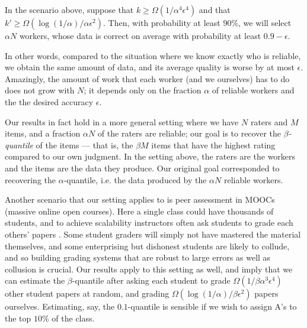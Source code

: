 \begin{theorem}
\label{thm:intro}
In the scenario above, suppose that $k \geq \Omega(1/\alpha^4\epsilon^4)$
and that $k' \geq \Omega(\log(1/\alpha)/\alpha\epsilon^2)$. Then, with probability 
at least $90\%$, we will select $\alpha N$ workers, whose data is correct on 
average with probability at least $0.9-\epsilon$.
\end{theorem}
In other words, compared to the situation where we know exactly who is reliable, 
we obtain the same amount of data, and its average quality is worse by at most 
$\epsilon$. Amazingly, the amount of work that each worker (and we ourselves) has 
to do does not grow with $N$; it depends only on the fraction $\alpha$ of 
reliable workers and the the desired accuracy $\epsilon$.

Our results in fact hold in a more general setting where we have $N$ raters and 
$M$ items, and a fraction $\alpha N$ of the raters are reliable; our goal is to 
recover the \emph{$\beta$-quantile} of the items --- that is, the $\beta M$ items 
that have the highest rating compared to our own judgment. In the setting above, 
the raters are the workers and the items are the data they produce. Our original 
goal corresponded to recovering the $\alpha$-quantile, i.e. the data 
produced by the $\alpha N$ reliable workers.

Another scenario that our setting applies to is peer assessment in MOOCs (massive 
online open courses). Here a single class could have thousands of students, 
and to achieve scalability instructors often ask students to grade each others' 
papers \citep{kulkarni2015peer,piech2013tuned}. 
Some student graders will simply not have mastered the material themselves, 
and some enterprising but dishonest students are likely to collude, and 
so building grading systems that are robust to large errors as well as 
collusion is crucial. 
Our results apply to this setting as well, and imply that we can estimate the 
$\beta$-quantile after asking each student to grade 
$\Omega(1/\beta\alpha^3\epsilon^4)$ other student papers at random, and 
grading $\Omega(\log(1/\alpha)/\beta\epsilon^2)$ papers ourselves.
Estimating, say, the $0.1$-quantile is 
sensible if we wish to assign A's to the top $10\%$ of the class. 



